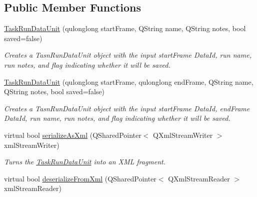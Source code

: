 \subsection*{Public Member Functions}
\begin{DoxyCompactItemize}
\item 
\hypertarget{class_picto_1_1_task_run_data_unit_a4d6e087251c105e7b20242a446e80049}{\hyperlink{class_picto_1_1_task_run_data_unit_a4d6e087251c105e7b20242a446e80049}{Task\-Run\-Data\-Unit} (qulonglong start\-Frame, Q\-String name, Q\-String notes, bool saved=false)}\label{class_picto_1_1_task_run_data_unit_a4d6e087251c105e7b20242a446e80049}

\begin{DoxyCompactList}\small\item\em Creates a Tasn\-Run\-Data\-Unit object with the input start\-Frame Data\-Id, run name, run notes, and flag indicating whether it will be saved. \end{DoxyCompactList}\item 
\hypertarget{class_picto_1_1_task_run_data_unit_ab6099937d0558a055fbf25846a599b55}{\hyperlink{class_picto_1_1_task_run_data_unit_ab6099937d0558a055fbf25846a599b55}{Task\-Run\-Data\-Unit} (qulonglong start\-Frame, qulonglong end\-Frame, Q\-String name, Q\-String notes, bool saved=false)}\label{class_picto_1_1_task_run_data_unit_ab6099937d0558a055fbf25846a599b55}

\begin{DoxyCompactList}\small\item\em Creates a Tasn\-Run\-Data\-Unit object with the input start\-Frame Data\-Id, end\-Frame Data\-Id, run name, run notes, and flag indicating whether it will be saved. \end{DoxyCompactList}\item 
\hypertarget{class_picto_1_1_task_run_data_unit_a57b03f03772b92846c7ac0f7a7532bc3}{virtual bool \hyperlink{class_picto_1_1_task_run_data_unit_a57b03f03772b92846c7ac0f7a7532bc3}{serialize\-As\-Xml} (Q\-Shared\-Pointer$<$ Q\-Xml\-Stream\-Writer $>$ xml\-Stream\-Writer)}\label{class_picto_1_1_task_run_data_unit_a57b03f03772b92846c7ac0f7a7532bc3}

\begin{DoxyCompactList}\small\item\em Turns the \hyperlink{class_picto_1_1_task_run_data_unit}{Task\-Run\-Data\-Unit} into an X\-M\-L fragment. \end{DoxyCompactList}\item 
virtual bool \hyperlink{class_picto_1_1_task_run_data_unit_ae0f5008e26014c7a7ed0ee7dbdeebd93}{deserialize\-From\-Xml} (Q\-Shared\-Pointer$<$ Q\-Xml\-Stream\-Reader $>$ xml\-Stream\-Reader)
\end{DoxyCompactItemize}

